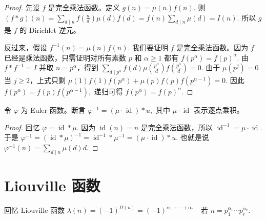 \begin{proof}
	先设 $f$ 是完全乘法函数。定义
	\(\textstyle g(n)=\allowbreak{}\mu(n)f(n).\)
	则
	\(\textstyle (f*g)(n) =\allowbreak{} \sum_{d\mid\allowbreak{} n}f\left(\frac nd\right)\mu(d)f(d) =\allowbreak{} f(n)\sum_{d\mid\allowbreak{} n}\mu(d) =\allowbreak{} I(n).\)
	所以 $g$ 是 $f$ 的 Dirichlet 逆元。

	反过来，假设
	\(\textstyle f^{-1}(n)=\allowbreak{}\mu(n)f(n).\)
	我们要证明 $f$ 是完全乘法函数。因为 $f$ 已经是乘法函数，只需证明对所有素数 $p$ 和 $\alpha\geq 1$ 都有
	\(\textstyle f(p^\alpha)=\allowbreak{}f(p)^\alpha.\)
	由
	\(\textstyle f*f^{-1}=\allowbreak{}I\)
	并取 $n=p^\alpha$，得到
	\(\textstyle \sum_{d\mid\allowbreak{} p^\alpha} f(d)\mu\left(\frac{p^\alpha}{d}\right)f\left(\frac{p^\alpha}{d}\right) =\allowbreak{}0.\)
	由于 $\mu(p^j)=0$ 当 $j\geq 2$，上式只剩
	\(\textstyle \mu(1)f(1)f(p^\alpha)+\allowbreak{}\mu(p)f(p)f(p^{\alpha-1})=\allowbreak{}0.\)
	因此
	\(\textstyle f(p^\alpha)=\allowbreak{}f(p)f(p^{\alpha-1}),\allowbreak{}\)
	递归可得
	\(\textstyle f(p^\alpha)=\allowbreak{}f(p)^\alpha.\)
\end{proof}


\begin{example}
	令 $\varphi$ 为 Euler 函数。断言
	\(\textstyle \varphi^{-1}=\allowbreak{}(\mu\cdot\operatorname{id})*u,\allowbreak{}\)
	其中 $\mu\cdot\operatorname{id}$ 表示逐点乘积。
\end{example}

\begin{proof}
	回忆
	\(\textstyle \varphi=\allowbreak{}\operatorname{id}*\mu.\)
	因为 $\operatorname{id}(n)=n$ 是完全乘法函数，所以
	\(\textstyle \operatorname{id}^{-1}=\allowbreak{}\mu\cdot\operatorname{id}.\)
	于是
	\(\textstyle \varphi^{-1} =\allowbreak{} (\operatorname{id}*\mu)^{-1} =\allowbreak{} \operatorname{id}^{-1}*\mu^{-1} =\allowbreak{} (\mu\cdot\operatorname{id})*u.\)
	也就是说
	\(\textstyle \varphi^{-1}(n)=\allowbreak{}\sum_{d\mid\allowbreak{} n}\mu(d)d.\)
\end{proof}

\section{Liouville 函数}

回忆 Liouville 函数
\(\textstyle \lambda(n)=\allowbreak{}(-1)^{\Omega(n)} =\allowbreak{} (-1)^{\alpha_1+\allowbreak{}\cdots+\allowbreak{}\alpha_r} \quad \text{若 } n=\allowbreak{}p_1^{\alpha_1}\cdots p_r^{\alpha_r}.\)

